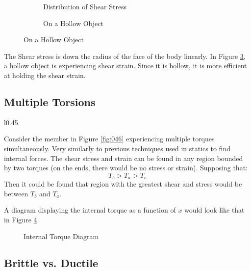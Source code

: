 \documentclass[12pt]{article}
\begin{document}
\begin{figure}[H]
  \centering
  \begin{subfigure}[H]{0.45\textwidth}
    \centering
    
    \caption{Distribution of Shear Stress}
    \label{fig:043}
  \end{subfigure}
  \begin{subfigure}[H]{0.45\textwidth}
    \centering
    
    \caption{On a Hollow Object}
    \label{fig:044}
  \end{subfigure}
\end{figure}

The Shear stress is down the radius of the face of the body linearly. In Figure \ref{fig:044}, a hollow object is experiencing shear strain. Since it is hollow, it is more efficient at holding the shear strain.

\subsection{Multiple Torsions}
\label{ssec:multipleTorsions}

\begin{wrapfigure}[9]{l}{0.45\textwidth}
  \vspace{-10pt}
  \centering
  
  \caption{Multiple Torques}
  \label{fig:046}
\end{wrapfigure}

Consider the member in Figure \ref{fig:046} experiencing multiple torques simultaneously. Very similarly to previous techniques used in statics to find internal forces. The shear stress and strain can be found in any region bounded by two torques (on the ends, there would be no stress or strain). Supposing that:
\begin{equation*}
  T_b > T_a > T_c
\end{equation*}
Then it could be found that region with the greatest shear and stress would be between $T_b$ and $T_a$.

A diagram displaying the internal torque as a function of $x$ would look like that in Figure \ref{fig:047}.

\begin{figure}[H]
  \centering
  
  \caption{Internal Torque Diagram}
  \label{fig:047}
\end{figure}

\subsection{Brittle vs. Ductile}
\label{ssec:brittleVsDuctile}
\end{document}
